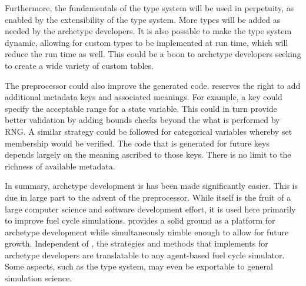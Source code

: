 Furthermore, the fundamentals of the \cyclus type system will be used in 
perpetuity, as enabled by the extensibility of the type system.  More types
will be added as needed by the archetype developers.  It is also possible to 
make the type system dynamic, allowing for custom types to be implemented at run time,
which will reduce the run time as well.
This could be a boon to archetype developers seeking to create a wide variety of custom
tables.

The preprocessor could also improve the generated code. \Cyclus reserves the right
to add additional metadata keys and associated meanings.  For example, a 
key could specify the acceptable range for a state variable. This could in turn 
provide better validation by adding bounds checks beyond the what is performed
by \gls{RNG}. A similar strategy could be followed for categorical variables whereby
set membership would be verified. The code that is generated for future keys 
depends largely on the meaning ascribed to those keys. There is no limit 
to the richness of available metadata.

In summary, archetype development is has been made significantly easier. This is due in large
part to the advent of the \cyclus preprocessor. While \cycpp itself is the fruit of
a large computer science and software development effort, it is used here 
primarily to improve fuel cycle simulations. \cyclus provides a solid ground 
as a platform for archetype development while simultaneously nimble enough
to allow for future growth. Independent of \cyclus, the strategies and methods that
\cyclus implements for archetype developers are translatable to any agent-based 
fuel cycle simulator.  Some aspects, such as the type system,  may even be exportable 
to general simulation science. 

